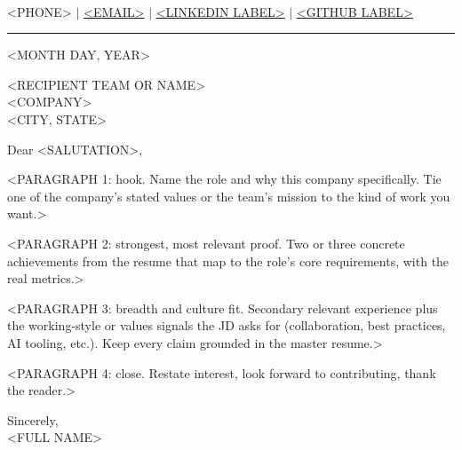 \documentclass[letterpaper,11pt]{article}
\begin{document}
\begin{center}
    \textbf{\Huge \scshape <FULL NAME>} \\ \vspace{2pt}
    \small <PHONE> $|$ \href{mailto:<EMAIL>}{\underline{<EMAIL>}} $|$
    \href{<LINKEDIN URL>}{\underline{<LINKEDIN LABEL>}} $|$
    \href{<GITHUB URL>}{\underline{<GITHUB LABEL>}}
\end{center}

\vspace{-6pt}
\rule{\textwidth}{0.8pt}

\vspace{4pt}
<MONTH DAY, YEAR>

<RECIPIENT TEAM OR NAME> \\
<COMPANY> \\
<CITY, STATE>

Dear <SALUTATION>,

<PARAGRAPH 1: hook. Name the role and why this company specifically. Tie one of
the company's stated values or the team's mission to the kind of work you want.>

<PARAGRAPH 2: strongest, most relevant proof. Two or three concrete
achievements from the resume that map to the role's core requirements, with the
real metrics.>

<PARAGRAPH 3: breadth and culture fit. Secondary relevant experience plus the
working-style or values signals the JD asks for (collaboration, best practices,
AI tooling, etc.). Keep every claim grounded in the master resume.>

<PARAGRAPH 4: close. Restate interest, look forward to contributing, thank the
reader.>

\vspace{6pt}
Sincerely, \\
<FULL NAME>
\end{document}
